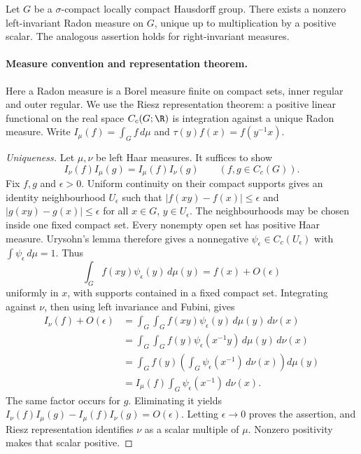 
\begin{theorem}
Let $G$ be a $\sigma$-compact locally compact Hausdorff group. There exists a
nonzero left-invariant Radon measure on $G$, unique up to multiplication by
a positive scalar. The analogous assertion holds for right-invariant
measures.
\end{theorem}
\paragraph{Measure convention and representation theorem.}
Here a Radon measure is a Borel measure finite on compact sets, inner
regular and outer regular. We use the Riesz representation theorem:
a positive linear functional on the real space $C_c(G;\R)$ is integration
against a unique Radon measure. Write $I_\mu(f)=\int_G f\,d\mu$ and
$\tau(y)f(x)=f(y^{-1}x)$.

\begin{proof}[Uniqueness]
Let $\mu,\nu$ be left Haar measures. It suffices to show
\[
 I_\nu(f)I_\mu(g)=I_\mu(f)I_\nu(g)\qquad(f,g\in C_c(G)).
\]
Fix $f,g$ and $\epsilon>0$. Uniform continuity on their compact supports
gives an identity neighbourhood $U_\epsilon$ such that
$|f(xy)-f(x)|\leq\epsilon$ and $|g(xy)-g(x)|\leq\epsilon$ for all $x\in G$,
$y\in U_\epsilon$. The neighbourhoods may be chosen inside one fixed compact
set. Every nonempty open set has positive Haar measure. Urysohn's lemma
therefore gives a nonnegative $\psi_\epsilon\in C_c(U_\epsilon)$ with
$\int\psi_\epsilon\,d\mu=1$. Thus
\[
 \int_G f(xy)\psi_\epsilon(y)\,d\mu(y)=f(x)+O(\epsilon)
\]
uniformly in $x$, with supports contained in a fixed compact set.
Integrating against $\nu$, then using left invariance and Fubini, gives
\[
\begin{aligned}
 I_\nu(f)+O(\epsilon)
 &=\int_G\int_G f(xy)\psi_\epsilon(y)\,d\mu(y)\,d\nu(x)\\
 &=\int_G\int_G f(y)\psi_\epsilon(x^{-1}y)\,d\mu(y)\,d\nu(x)\\
 &=\int_G f(y)\left(\int_G\psi_\epsilon(x^{-1})\,d\nu(x)\right)d\mu(y)\\
 &=I_\mu(f)\int_G\psi_\epsilon(x^{-1})\,d\nu(x).
\end{aligned}
\]
The same factor occurs for $g$. Eliminating it yields
$I_\nu(f)I_\mu(g)-I_\mu(f)I_\nu(g)=O(\epsilon)$.
Letting $\epsilon\to0$ proves the assertion, and Riesz representation
identifies $\nu$ as a scalar multiple of $\mu$. Nonzero positivity makes
that scalar positive.
\end{proof}

